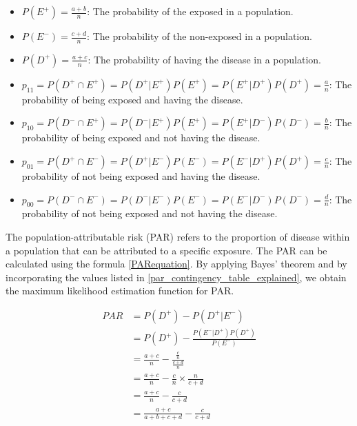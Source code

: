 \begin{itemize}
    \item $P(E^+) = \frac{a + b}{n}$: The probability of the exposed in a population.
    \item $P(E^-) = \frac{c + d}{n}$: The probability of the non-exposed in a population.
    \item $P(D^+) = \frac{a + c}{n}$: The probability of having the disease in a population.
    \item $p_{11} = P(D^+ \cap E^+) = P(D^+ | E^+)P(E^+) = P(E^+ | D^+)P(D^+) = \frac{a}{n}$: The probability of being exposed and having the disease.
    \item $p_{10} = P(D^- \cap E^+) = P(D^- | E^+)P(E^+) = P(E^+ | D^-)P(D^-) = \frac{b}{n}$: The probability of being exposed and not having the disease.
    \item $p_{01} = P(D^+ \cap E^-) = P(D^+ | E^-)P(E^-) = P(E^- | D^+)P(D^+) = \frac{c}{n}$: The probability of not being exposed and having the disease.
    \item $p_{00} = P(D^- \cap E^-) = P(D^- | E^-)P(E^-) = P(E^- | D^-)P(D^-) = \frac{d}{n}$: The probability of not being exposed and not having the disease.
\end{itemize}\label{par_contingency_table_explained}

The population-attributable risk (PAR) refers to the proportion of disease within a population that can be attributed to a specific exposure. The PAR can be calculated using the formula \ref{PARequation}. By applying Bayes' theorem and by incorporating the values listed in \ref{par_contingency_table_explained}, we obtain the maximum likelihood estimation function for PAR.

\begin{equation}\label{PARequationProof}
\begin{aligned}
PAR &= P(D^+) - P(D^+| E^-) \\
    &= P(D^+) - \frac{P(E^-|D^+)P(D^+)}{P(E^-)} \\
    &= \frac{a + c}{n} - \frac{\frac{c}{n}}{\frac{c + d}{n}} \\
    &= \frac{a + c}{n} - \frac{c}{n} \times  \frac{n}{c + d} \\
    &= \frac{a + c}{n} - \frac{c}{c + d} \\
    &= \frac{a + c}{a + b + c + d} - \frac{c}{c + d} \\
\end{aligned}
\end{equation}

